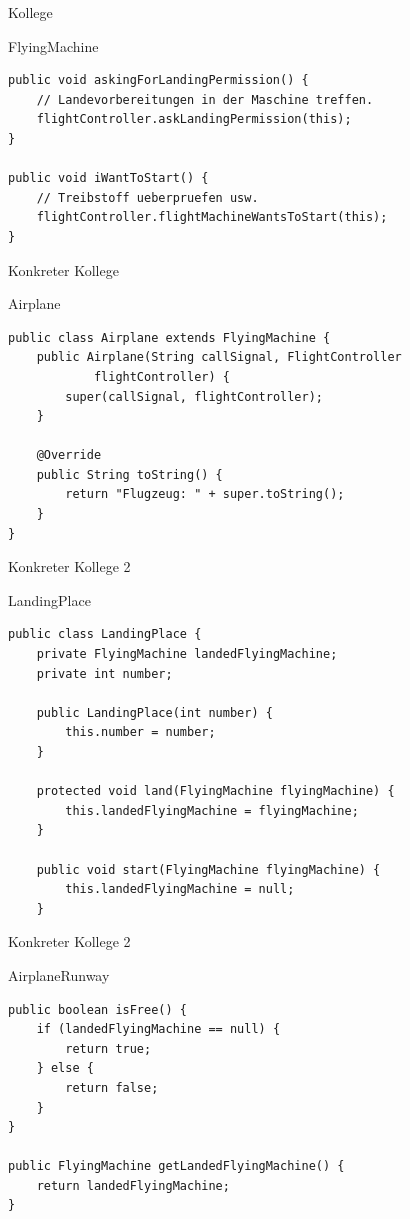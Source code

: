 \begin{frame}[fragile]{Kollege}
	\begin{exampleblock}{FlyingMachine}
 		\begin{lstlisting}
public void askingForLandingPermission() {
    // Landevorbereitungen in der Maschine treffen.
    flightController.askLandingPermission(this);
}

public void iWantToStart() {
    // Treibstoff ueberpruefen usw.
    flightController.flightMachineWantsToStart(this);
}
        \end{lstlisting}
 	\end{exampleblock}
\end{frame}

\begin{frame}[fragile]{Konkreter Kollege}
	\begin{exampleblock}{Airplane}
 		\begin{lstlisting}
public class Airplane extends FlyingMachine {
	public Airplane(String callSignal, FlightController 
			flightController) {
		super(callSignal, flightController);
	}

	@Override
	public String toString() {
		return "Flugzeug: " + super.toString();
	}
}
        \end{lstlisting}
 	\end{exampleblock}
\end{frame}

\begin{frame}[fragile]{Konkreter Kollege 2}
	\begin{exampleblock}{LandingPlace}
 		\begin{lstlisting}
public class LandingPlace {
	private FlyingMachine landedFlyingMachine;
	private int number;
	
	public LandingPlace(int number) {
		this.number = number;
	}
	
	protected void land(FlyingMachine flyingMachine) {
		this.landedFlyingMachine = flyingMachine;
	}
	
	public void start(FlyingMachine flyingMachine) {
		this.landedFlyingMachine = null;
	}
        \end{lstlisting}
 	\end{exampleblock}
\end{frame}

\begin{frame}[fragile]{Konkreter Kollege 2}
	\begin{exampleblock}{AirplaneRunway}
 		\begin{lstlisting}
public boolean isFree() {
    if (landedFlyingMachine == null) {
        return true;
    } else {
        return false;
    }
}

public FlyingMachine getLandedFlyingMachine() {
    return landedFlyingMachine;
}
	
        \end{lstlisting}
 	\end{exampleblock}
\end{frame}

